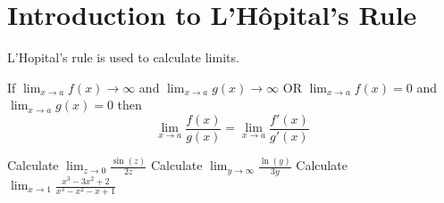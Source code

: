\section*{Introduction to L'H\^opital's Rule}

L'Hopital's rule is used to calculate limits.

\vspace{\baselineskip}
\noindent If $\displaystyle{\lim_{x\to a} f(x)\to\infty}$ and $\displaystyle{\lim_{x\to a} g(x)\to\infty}$ OR $\displaystyle{\lim_{x\to a} f(x)=0}$ and $\displaystyle{\lim_{x\to a} g(x)=0}$   then
$$\lim_{x\to a} \frac{f(x)}{g(x)} = \lim_{x\to a} \frac{f'(x)}{g'(x)}$$ 

\begin{questions}
\question
Calculate
$\displaystyle{\lim_{z\to 0} \frac{\sin(z)}{2z}}$
\question
Calculate $\displaystyle{\lim_{y\to \infty} \frac{\ln(y)}{3y}}$
\vspace{1.5in}
\question
Calculate  $\displaystyle{\lim_{x\to 1} \frac{x^3-3x^2+2}{x^3-x^2-x+1}}$
\vspace{1.5in}
\question
{}
\end{questions}
